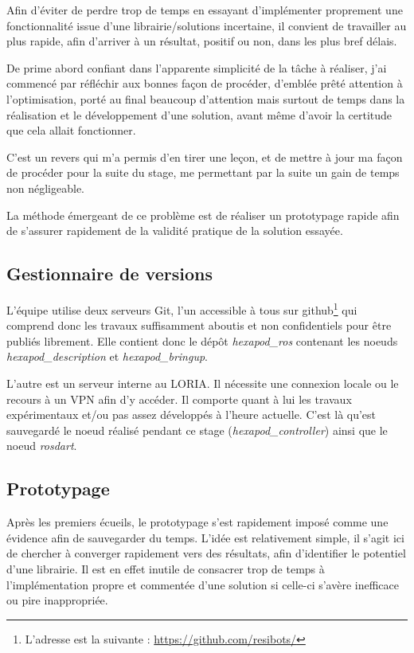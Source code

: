 \documentclass{tnreport}
\begin{document}
Afin d'éviter de perdre trop de temps en essayant d'implémenter proprement une fonctionnalité issue d'une librairie/solutions incertaine, il convient de travailler au plus rapide, afin d'arriver à un résultat, positif ou non, dans les plus bref délais. 

De prime abord confiant dans l'apparente simplicité de la tâche à réaliser, j'ai commencé par réfléchir aux bonnes façon de procéder, d'emblée prêté attention à l'optimisation, porté au final beaucoup d'attention mais surtout de temps dans la réalisation et le développement d'une solution, avant même d'avoir la certitude que cela allait fonctionner. 

C'est un revers qui m'a permis d'en tirer une leçon, et de mettre à jour ma façon de procéder pour la suite du stage, me permettant par la suite un gain de temps non négligeable. 

La méthode émergeant de ce problème est de réaliser un prototypage rapide afin de s'assurer rapidement de la validité pratique de la solution essayée.

\subsection{Gestionnaire de versions}

L'équipe utilise deux serveurs Git, l'un accessible à tous sur github\footnote{L'adresse est la suivante : \url{https://github.com/resibots/}} qui comprend donc les travaux suffisamment aboutis et non confidentiels pour être publiés librement. Elle contient donc le dépôt \textit{hexapod\_ros} contenant les noeuds \textit{hexapod\_description} et \textit{hexapod\_bringup}.

L'autre est un serveur interne au \gls{LORIA}. Il nécessite une connexion locale ou le recours à un \gls{VPN} afin d'y accéder. Il comporte quant à lui les travaux expérimentaux et/ou pas assez développés à l'heure actuelle. C'est là qu'est sauvegardé le noeud réalisé pendant ce stage (\textit{hexapod\_controller}) ainsi que le noeud \textit{rosdart}. 

\subsection{Prototypage}
Après les premiers écueils, le prototypage s'est rapidement imposé comme une évidence afin de sauvegarder du temps. L'idée est relativement simple, il s'agit ici de chercher à converger rapidement vers des résultats, afin d'identifier le potentiel d'une librairie. Il est en effet inutile de consacrer trop de temps à l'implémentation propre et commentée d'une solution si celle-ci s'avère inefficace ou pire inappropriée. 
\end{document}
